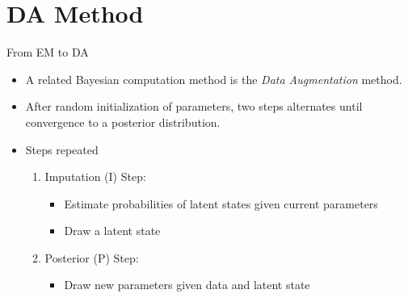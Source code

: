 \documentclass[dvipdfmx,bigger,aspectratio=169]{beamer}
\begin{document}
\section{DA Method}
\label{sec:org5225197}
\begin{frame}[label={sec:org5fe3f8c}]{}
\begin{center}
\end{center}
\end{frame}

\begin{frame}[label={sec:org7759390}]{From EM to DA}
\begin{itemize}
\item A related Bayesian computation method is the \emph{Data Augmentation} method. \cite{tannerCalculationPosteriorDistributions1987,tannerEMDataAugmentation2010}
\item After random initialization of parameters, two steps alternates until convergence to a posterior distribution.
\item Steps repeated
\begin{enumerate}
\item Imputation (I) Step:
\begin{itemize}
\item Estimate probabilities of latent states given current parameters
\item Draw a latent state
\end{itemize}
\item Posterior (P) Step:
\begin{itemize}
\item Draw new parameters given data and latent state
\end{itemize}
\end{enumerate}
\end{itemize}
\end{frame}
\end{document}
